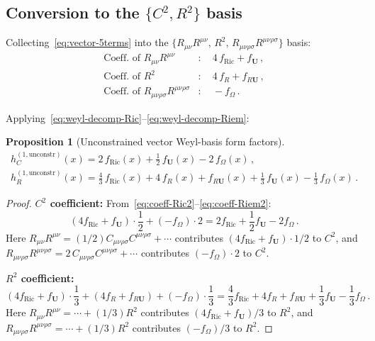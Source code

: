 \documentclass[11pt,a4paper]{article}
\newcommand{\Ricsq}{R_{\mu\nu}R^{\mu\nu}}
\newcommand{\Rsq}{R_{\mu\nu\rho\sigma}R^{\mu\nu\rho\sigma}}
\newcommand{\Weylsq}{C_{\mu\nu\rho\sigma}C^{\mu\nu\rho\sigma}}
\newtheorem{proposition}[theorem]{Proposition}
\theoremstyle{definition}
\theoremstyle{remark}
\begin{document}
\subsection{Conversion to the $\{C^2, R^2\}$ basis}

Collecting~\eqref{eq:vector-5terms} into the
$\{\Ricsq,\,R^2,\,\Rsq\}$ basis:
\begin{align}
  \text{Coeff.\ of } \Ricsq &:
  \quad 4\,f_{\mathrm{Ric}} + f_{\mathbf{U}}\,,
  \label{eq:coeff-Ric2}\\
  \text{Coeff.\ of } R^2 &:
  \quad 4\,f_R + f_{R\mathbf{U}}\,,
  \label{eq:coeff-R2-raw}\\
  \text{Coeff.\ of } \Rsq &:
  \quad -f_\Omega\,.
  \label{eq:coeff-Riem2}
\end{align}

Applying~\eqref{eq:weyl-decomp-Ric}--\eqref{eq:weyl-decomp-Riem}:

\begin{proposition}[Unconstrained vector Weyl-basis form factors]
\label{prop:unconstr}
\begin{align}
  \boxed{
  h_C^{(1,\mathrm{unconstr})}(x)
  = 2\,f_{\mathrm{Ric}}(x) + \frac{1}{2}\,f_{\mathbf{U}}(x)
    - 2\,f_\Omega(x)\,,
  }
  \label{eq:hC-unconstr}\\[6pt]
  \boxed{
  h_R^{(1,\mathrm{unconstr})}(x)
  = \frac{4}{3}\,f_{\mathrm{Ric}}(x) + 4\,f_R(x)
    + f_{R\mathbf{U}}(x)
    + \frac{1}{3}\,f_{\mathbf{U}}(x)
    - \frac{1}{3}\,f_\Omega(x)\,.
  }
  \label{eq:hR-unconstr}
\end{align}
\end{proposition}

\begin{proof}
\textbf{$C^2$ coefficient:}
From~\eqref{eq:coeff-Ric2}--\eqref{eq:coeff-Riem2}:
\begin{equation*}
  (4f_{\mathrm{Ric}} + f_{\mathbf{U}})\cdot\frac{1}{2}
  + (-f_\Omega)\cdot 2
  = 2f_{\mathrm{Ric}} + \frac{1}{2}f_{\mathbf{U}} - 2f_\Omega\,.
\end{equation*}
Here $\Ricsq = (1/2)\Weylsq + \cdots$ contributes
$(4f_{\mathrm{Ric}} + f_{\mathbf{U}})\cdot 1/2$ to $C^2$,
and $\Rsq = 2\,\Weylsq + \cdots$ contributes
$(-f_\Omega)\cdot 2$ to $C^2$.

\medskip\noindent
\textbf{$R^2$ coefficient:}
\begin{equation*}
  (4f_{\mathrm{Ric}} + f_{\mathbf{U}})\cdot\frac{1}{3}
  + (4f_R + f_{R\mathbf{U}})
  + (-f_\Omega)\cdot\frac{1}{3}
  = \frac{4}{3}f_{\mathrm{Ric}} + 4f_R + f_{R\mathbf{U}}
  + \frac{1}{3}f_{\mathbf{U}} - \frac{1}{3}f_\Omega\,.
\end{equation*}
Here $\Ricsq = \cdots + (1/3)R^2$ contributes
$(4f_{\mathrm{Ric}} + f_{\mathbf{U}})/3$ to $R^2$,
and $\Rsq = \cdots + (1/3)R^2$ contributes
$(-f_\Omega)/3$ to $R^2$.
\end{proof}
\end{document}

